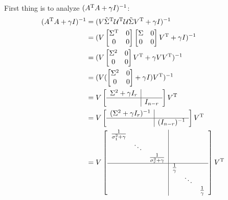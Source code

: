 First thing is to analyze $(A^{{\rm T}}A + \gamma I)^{-1}$:
\begin{align*}
(A^{{\rm T}}A + \gamma I)^{-1} &= (V\tilde{\Sigma}^{{\rm T}}\mathcal{U}^{{\rm T}}\mathcal{U}\tilde{\Sigma}V^{{\rm T}} + \gamma I)^{-1}\\
&= (V
\begin{bmatrix}
\Sigma^{{\rm T}} & 0\\
0 & 0\\
\end{bmatrix}
\begin{bmatrix}
\Sigma & 0\\
0 & 0\\
\end{bmatrix}
V^{{\rm T}} + \gamma I)^{-1}\\
&=(V
\begin{bmatrix}
\Sigma^2 & 0\\
0  & 0
\end{bmatrix}
V^{{\rm T}} + \gamma VV^{{\rm T}}
)^{-1}\\
&= (V(
\begin{bmatrix}
\Sigma^2 & 0\\
0 & 0
\end{bmatrix}
+\gamma I)V^{{\rm T}})^{-1}\\
&= V
\left[
\begin{array}{c|c}
\Sigma^2+\gamma I_r&  \\ \hline 
& I_{n-r}
\end{array}
\right]
V^{{\rm T}}\\
&=
V
\left[
\begin{array}{c|c}
(\Sigma^2+\gamma I_r)^{-1}&  \\ \hline 
& (I_{n-r})^{-1}
\end{array}
\right]
V^{{\rm T}}\\
&=
V
\left[
\begin{array}{c|c}
\begin{matrix}
\frac{1}{\sigma_1^2+\gamma} & &\\
&\ddots&\\
&&\frac{1}{\sigma_r^2+\gamma}
\end{matrix}&  \\ \hline 
& \begin{matrix}
\frac{1}{\gamma} & &\\
&\ddots&\\
&&\frac{1}{\gamma}
\end{matrix}
\end{array}
\right]
V^{{\rm T}}
\end{align*}

